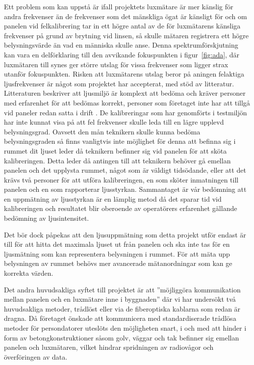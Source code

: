        Ett problem som kan uppstå är ifall projektets luxmätare är mer känslig för andra frekvenser än de frekvenser som det mänskliga ögat är känsligt för och om panelen vid felkalibrering tar in ett högre antal av de för luxmätarens känsliga frekvenser på grund av brytning vid linsen, så skulle mätaren registrera ett högre belysningsvärde än vad en människa skulle anse. Denna spektrumförskjutning kan vara en delförklaring till den avvikande fokuspunkten i figur~\ref{fig:ada}, där luxmätaren till synes ger större utslag för vissa frekvenser som ligger strax utanför fokuspunkten. Risken att luxmätarens utslag beror på aningen felaktiga ljusfrekvenser är något som projektet har accepterat, med stöd av litteratur. Litteraturen beskriver att ljusmiljö är komplext att bedöma och kräver personer med erfarenhet för att bedömas korrekt, personer som företaget inte har att tillgå vid paneler redan satta i drift \cite[s.~278]{aot}. De kalibreringar som har genomförts i testmiljön har inte kunnat visa på att fel frekvenser skulle leda till en lägre upplevd belysningsgrad. Oavsett den mån teknikern skulle kunna bedöma belysningsgraden så finns vanligtvis inte möjlighet för denna att befinna sig i rummet dit ljuset leder då teknikern befinner sig vid panelen för att sköta kalibreringen. Detta leder då antingen till att teknikern behöver gå emellan panelen och det upplysta rummet, något som är väldigt tidsödande, eller att det krävs två personer för att utföra kalibreringen, en som sköter inmatningen till panelen och en som rapporterar ljusstyrkan. Sammantaget är vår bedömning att en uppmätning av ljusstyrkan är en lämplig metod då det sparar tid vid kalibreringen och resultatet blir oberoende av operatörers erfarenhet gällande bedömning av ljusintensitet. \bigskip

        Det bör dock påpekas att den ljusuppmätning som detta projekt utför endast är till för att hitta det maximala ljuset ut från panelen och ska inte tas för en ljusmätning som kan representera belysningen i rummet. För att mäta upp belysningen av rummet behövs mer avancerade mätanordningar som kan ge korrekta värden.\bigskip

        Det andra huvudsakliga syftet till projektet är att ''möjliggöra kommunikation mellan panelen och en luxmätare inne i byggnaden'' där vi har undersökt två huvudsakliga metoder, trådlöst eller via de fiberoptiska kablarna som redan är dragna. Då företaget önskade att kommunicera med standardiserade trådlösa metoder för persondatorer uteslöts den möjligheten snart, i och med att hinder i form av betongkonstruktioner såsom golv, väggar och tak befinner sig emellan panelen och luxmätaren, vilket hindrar spridningen av radiovågor och överföringen av data.\bigskip

